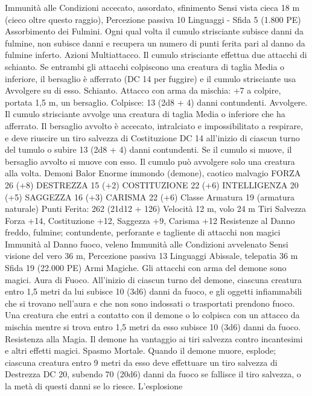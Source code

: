 \begin{multicols}{2}
Immunità alle Condizioni accecato, assordato, sfinimento
Sensi vista cieca 18 m (cieco oltre questo raggio), Percezione
passiva 10
Linguaggi -
Sfida 5 (1.800 PE)
Assorbimento dei Fulmini. Ogni qual volta il cumulo strisciante
subisce danni da fulmine, non subisce danni e recupera un
numero di punti ferita pari al danno da fulmine inferto.
Azioni
Multiattacco. Il cumulo strisciante effettua due attacchi di
schianto. Se entrambi gli attacchi colpiscono una creatura di
taglia Media o inferiore, il bersaglio è afferrato (DC 14 per
fuggire) e il cumulo strisciante usa Avvolgere su di esso.
Schianto. Attacco con arma da mischia: +7 a colpire, portata 1,5
m, un bersaglio.
Colpisce: 13 (2d8 + 4) danni contundenti.
Avvolgere. Il cumulo strisciante avvolge una creatura di taglia
Media o inferiore che ha afferrato. Il bersaglio avvolto è
accecato, intralciato e impossibilitato a respirare, e deve riuscire
un tiro salvezza di Costituzione DC 14 all’inizio di ciascun turno
del tumulo o subire 13 (2d8 + 4) danni contundenti. Se il cumulo
si muove, il bersaglio avvolto si muove con esso. Il cumulo può
avvolgere solo una creatura alla volta.
Demoni
Balor
Enorme immondo (demone), caotico malvagio
FORZA 26 (+8)
DESTREZZA 15 (+2)
COSTITUZIONE 22 (+6)
INTELLIGENZA 20 (+5)
SAGGEZZA 16 (+3)
CARISMA 22 (+6)
Classe Armatura 19 (armatura naturale)
\hspace*{0pt}\hfill{Punti Ferita}: 262 (21d12 + 126)
Velocità 12 m, volo 24 m
Tiri Salvezza Forza +14, Costituzione +12, Saggezza +9,
Carisma +12
Resistenze al Danno freddo, fulmine; contundente, perforante e
tagliente di attacchi non magici
Immunità al Danno fuoco, veleno
Immunità alle Condizioni avvelenato
Sensi visione del vero 36 m, Percezione passiva 13
Linguaggi Abissale, telepatia 36 m
Sfida 19 (22.000 PE)
Armi Magiche. Gli attacchi con arma del demone sono magici.
Aura di Fuoco. All’inizio di ciascun turno del demone, ciascuna
creatura entro 1,5 metri da lui subisce 10 (3d6) danni da fuoco, e
gli oggetti infiammabili che si trovano nell’aura e che non sono
indossati o trasportati prendono fuoco. Una creatura che entri a
contatto con il demone o lo colpisca con un attacco da mischia
mentre si trova entro 1,5 metri da esso subisce 10 (3d6) danni da
fuoco.
Resistenza alla Magia. Il demone ha vantaggio ai tiri salvezza
contro incantesimi e altri effetti magici.
Spasmo Mortale. Quando il demone muore, esplode; ciascuna
creatura entro 9 metri da esso deve effettuare un tiro salvezza di
Destrezza DC 20, subendo 70 (20d6) danni da fuoco se fallisce il
tiro salvezza, o la metà di questi danni se lo riesce. L’esplosione

\end{multicols}

